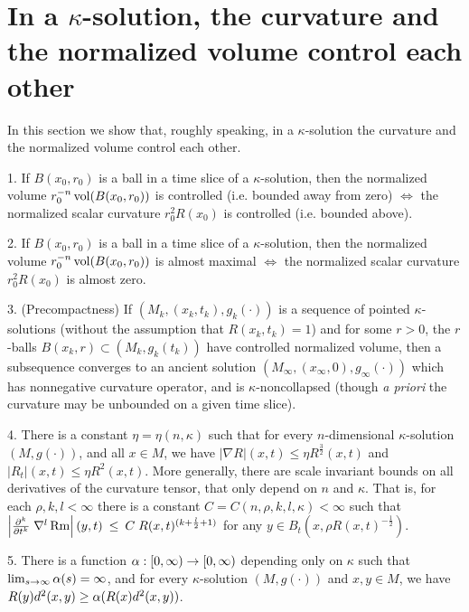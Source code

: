 \section{In a $\kappa$-solution, the curvature and the normalized
volume control each other}

In this section we show that, roughly speaking, in a
$\kappa$-solution
the curvature and the normalized volume control each other.


\begin{corollary}
  \label{cor:kl-solution-curvature-normalized-volume-control-each-other-existence-kappa-solutions}
 \label{11.4cors}
1.  If $B(x_0,r_0)$ is a ball in a time slice of a $\kappa$-solution,
then the normalized volume $r_0^{-n}\operatorname{vol}(B(x_0,r_0))$ is controlled
(i.e. bounded away from zero) $\Longleftrightarrow$
the normalized scalar curvature $r_0^2R(x_0)$ is controlled
(i.e. bounded above).

2. If $B(x_0,r_0)$ is a ball in a time slice of a $\kappa$-solution,
then the normalized volume $r_0^{-n}\operatorname{vol}(B(x_0,r_0))$ is almost
maximal $\Longleftrightarrow$
the normalized scalar curvature $r_0^2R(x_0)$ is almost zero.

3. (Precompactness)
If $(M_k,(x_k,t_k),g_k(\cdot))$ is a sequence of pointed $\kappa$-solutions
(without the assumption that $R(x_k, t_k) = 1$)
and for some $r>0$, the $r$-balls $B(x_k,r)\subset (M_k,g_k(t_k))$
have controlled normalized volume, then a subsequence converges
to an ancient solution $(M_\infty,(x_\infty,0),g_\infty(\cdot))$
which has nonnegative curvature operator, and is $\kappa$-noncollapsed
(though {\it a priori} the curvature may be unbounded on a given time slice).

4.
There is a constant
$\eta=\eta(n,\kappa)$ such that for every $n$-dimensional
$\kappa$-solution $(M,g(\cdot))$, and all $x\in M$, we have
$|\nabla R|(x,t)\leq \eta R^{\frac{3}{2}}(x,t)$ and
$|R_t|(x,t) \leq \eta R^2(x,t)$.
More generally, there are scale invariant bounds on
all derivatives of the curvature tensor, that only depend
on
$n$ and
$\kappa$. That is, for
each $\rho,k,l<\infty$ there is a constant
$C=C(n,\rho,k,l,\kappa) < \infty$
such that
$\left|\frac{\partial^k}{\partial t^k}\;
\nabla^l\operatorname{Rm}\right|(y,t) \: \le \: C\;R(x,t)^{(k+\frac{l}{2}+1)}$ for any
$y \in B_t(x,\rho R(x,t)^{-\frac12})$.


5.  There is a function $\alpha:[0,\infty)\rightarrow[0,\infty)$ depending only
on $\kappa$ such that $\lim_{s\rightarrow\infty}\alpha(s)=\infty$,
and  for every  $\kappa$-solution $(M,g(\cdot))$ and
$x,y\in M$, we have $R(y)d^2(x,y)\geq \alpha(R(x)d^2(x,y))$.
\end{corollary}
